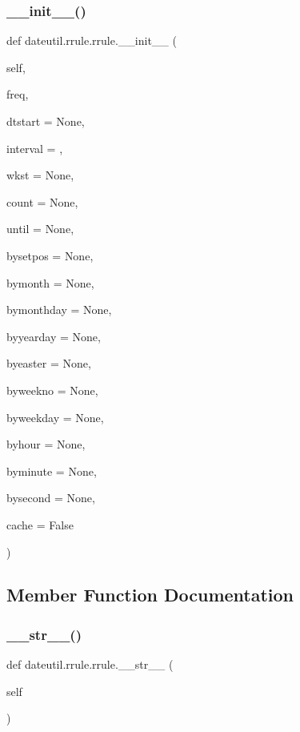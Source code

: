 \subsubsection{\texorpdfstring{\+\_\+\+\_\+init\+\_\+\+\_\+()}{\_\_init\_\_()}}
{\footnotesize\ttfamily def dateutil.\+rrule.\+rrule.\+\_\+\+\_\+init\+\_\+\+\_\+ (\begin{DoxyParamCaption}\item[{}]{self,  }\item[{}]{freq,  }\item[{}]{dtstart = {\ttfamily None},  }\item[{}]{interval = {},  }\item[{}]{wkst = {\ttfamily None},  }\item[{}]{count = {\ttfamily None},  }\item[{}]{until = {\ttfamily None},  }\item[{}]{bysetpos = {\ttfamily None},  }\item[{}]{bymonth = {\ttfamily None},  }\item[{}]{bymonthday = {\ttfamily None},  }\item[{}]{byyearday = {\ttfamily None},  }\item[{}]{byeaster = {\ttfamily None},  }\item[{}]{byweekno = {\ttfamily None},  }\item[{}]{byweekday = {\ttfamily None},  }\item[{}]{byhour = {\ttfamily None},  }\item[{}]{byminute = {\ttfamily None},  }\item[{}]{bysecond = {\ttfamily None},  }\item[{}]{cache = {\ttfamily False} }\end{DoxyParamCaption})}



\subsection{Member Function Documentation}
\mbox{\label{classdateutil_1_1rrule_1_1rrule_ae77f51669e2848e0260e3d8a88bfa0e4}} 
\subsubsection{\texorpdfstring{\+\_\+\+\_\+str\+\_\+\+\_\+()}{\_\_str\_\_()}}
{\footnotesize\ttfamily def dateutil.\+rrule.\+rrule.\+\_\+\+\_\+str\+\_\+\+\_\+ (\begin{DoxyParamCaption}\item[{}]{self }\end{DoxyParamCaption})}

